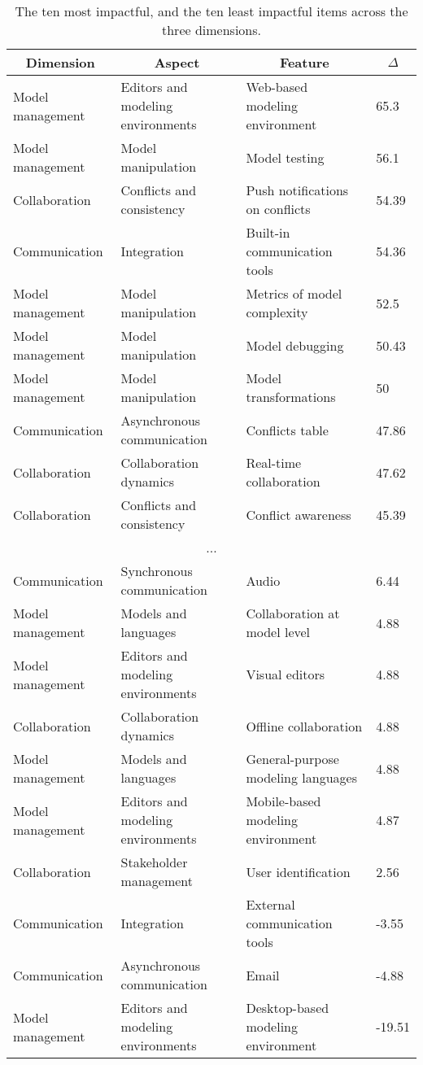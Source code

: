 
  \begin{table*}[]
  \centering
  \notsotiny
  \caption{ The ten most impactful, and the ten least impactful items across the three dimensions.}
\label{tab:top-bottom-delta}
\begin{tabular}{@{}llll@{}}
  \toprule
\multicolumn{1}{c}{\textbf{Dimension}} & \multicolumn{1}{c}{\textbf{Aspect}} & \multicolumn{1}{c}{\textbf{Feature}} & \multicolumn{1}{c}{\textbf{$\Delta$}} \\ 

  \midrule
  Model management & Editors and modeling environments & Web-based modeling environment & 65.3 \\ 
Model management & Model manipulation & Model testing & 56.1 \\ 
Collaboration & Conflicts and consistency & Push notifications on conflicts & 54.39 \\ 
Communication & Integration & Built-in communication tools & 54.36 \\ 
Model management & Model manipulation & Metrics of model complexity & 52.5 \\ 
Model management & Model manipulation & Model debugging & 50.43 \\ 
Model management & Model manipulation & Model transformations & 50 \\ 
Communication & Asynchronous communication & Conflicts table & 47.86 \\ 
Collaboration & Collaboration dynamics & Real-time collaboration & 47.62 \\ 
Collaboration & Conflicts and consistency & Conflict awareness & 45.39 \\ 
\multicolumn{4}{c}{...} \\ 
Communication & Synchronous communication & Audio & 6.44 \\ 
Model management & Models and languages & Collaboration at model level & 4.88 \\ 
Model management & Editors and modeling environments & Visual editors & 4.88 \\ 
Collaboration & Collaboration dynamics & Offline collaboration & 4.88 \\ 
Model management & Models and languages & General-purpose modeling languages & 4.88 \\ 
Model management & Editors and modeling environments & Mobile-based modeling environment & 4.87 \\ 
Collaboration & Stakeholder management & User identification & 2.56 \\ 
Communication & Integration & External communication tools & -3.55 \\ 
Communication & Asynchronous communication & Email & -4.88 \\ 
Model management & Editors and modeling environments & Desktop-based modeling environment & -19.51 \\ 
\bottomrule
  \end{tabular}%
  \end{table*}